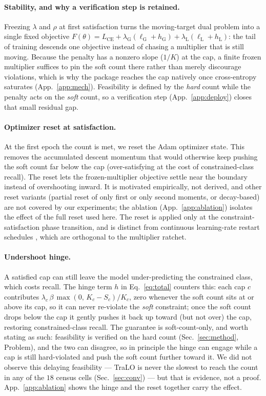 \documentclass[10pt]{article}
\begin{document}
\paragraph{Stability, and why a verification step is retained.}
Freezing $\lambda$ and $\rho$ at first satisfaction turns the moving-target
dual problem into a single fixed objective
$F(\theta)=L_{\text{CE}}+\lambda_{\mathrm{G}}(\ell_{\mathrm{G}}{+}h_{\mathrm{G}})+\lambda_{\mathrm{L}}(\ell_{\mathrm{L}}{+}h_{\mathrm{L}})$:
the tail of training descends one objective instead of chasing a multiplier
that is still moving. Because the penalty has a nonzero slope ($1/K$) at the
cap, a finite frozen multiplier suffices to pin the soft count there rather
than merely discourage violations, which is why the package reaches the cap
natively once cross-entropy saturates (App.~\ref{app:mech}). Feasibility is
defined by the \emph{hard} count while the penalty acts on the \emph{soft}
count, so a verification step (App.~\ref{app:deploy}) closes that small
residual gap.

\paragraph{Optimizer reset at satisfaction.}
At the first epoch the count is met, we reset the Adam optimizer state. This
removes the accumulated descent momentum that would otherwise keep pushing
the soft count far below the cap (over-satisfying at the cost of
constrained-class recall). The reset lets the frozen-multiplier objective
settle near the boundary instead of overshooting inward. It is motivated
empirically, not derived, and other reset variants (partial reset of only
first or only second moments, or decay-based) are not covered by our
experiments; the ablation (App.~\ref{app:ablation}) isolates the effect of
the full reset used here. The reset is applied only at the
constraint-satisfaction phase transition, and is distinct from continuous
learning-rate restart schedules \citep{loshchilov2017sgdr}, which are
orthogonal to the multiplier ratchet.

\paragraph{Undershoot hinge.}
A satisfied cap can still leave the model under-predicting the constrained
class, which costs recall. The hinge term $h$ in Eq.~\eqref{eq:total}
counters this: each cap $c$ contributes
$\lambda_c\,\beta\,\max(0,\,K_c-S_c)/K_c$, zero whenever the soft count sits
at or above its cap, so it can never re-violate
{the \emph{soft} constraint}; once the soft count drops
below the cap it gently pushes it back up toward (but not over) the cap,
restoring constrained-class recall.
{The guarantee is soft-count-only, and worth stating as such:
feasibility is verified on the hard count (Sec.~\ref{sec:method}, Problem), and
the two can disagree, so in principle the hinge can engage while a cap is still
hard-violated and push the soft count further toward it. We did not observe this
delaying feasibility --- TraLO is never the slowest to reach the count in any of
the $18$ census cells (Sec.~\ref{sec:conv}) --- but that is evidence, not a
proof.} App.~\ref{app:ablation} shows the hinge
and the reset together carry the effect.
\end{document}
